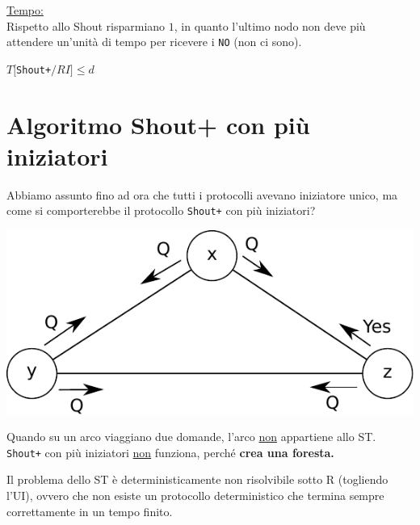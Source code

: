 \underline{Tempo:}\\
Rispetto allo Shout risparmiano $1$, in quanto l'ultimo nodo non deve più
attendere un'unità di tempo per ricevere i \texttt{NO} (non ci sono).
\begin{center}
    $T[$\texttt{Shout+}$/RI] \leq d$
\end{center}

\section{Algoritmo Shout+ con più iniziatori}
Abbiamo assunto fino ad ora che tutti i protocolli avevano iniziatore unico, ma
come si comporterebbe il protocollo \texttt{Shout+} con più iniziatori?
\begin{center}
    \includegraphics[scale=0.8]{capitoli/costruzione-spanning-tree/imgs/n_36}
\end{center}
Quando su un arco viaggiano due domande, l'arco \underline{non} appartiene allo
ST. \\
\texttt{Shout+} con più iniziatori \underline{non} funziona, perché \textbf{crea
    una foresta.}

\begin{theorem}
    Il problema dello ST è deterministicamente non risolvibile sotto R
    (togliendo l'UI), ovvero che non esiste un protocollo deterministico che
    termina sempre correttamente in un tempo finito.
\end{theorem}

